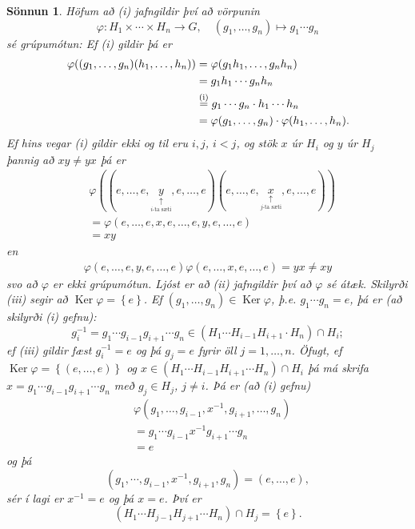 \documentclass[a4paper,icelandic,11pt]{book}
\theoremstyle{plain}
\newtheorem*{sonnun}{Sönnun}
\DeclareMathOperator{\Ker}{Ker} %
\begin{document}
\begin{sonnun}
  Höfum að (i) jafngildir því að vörpunin
  \[
    \varphi: H_1\times\cdots\times H_n\to G,
    \quad
    (g_1,\dots,g_n)\mapsto g_1\cdots g_n
  \]
  sé grúpumótun: Ef (i) gildir þá er 
  \begin{align*}
    \varphi((g_1,\dots,g_n)(h_1,\dots,h_n))
    &= \varphi(g_1h_1,\dots,g_nh_n)
    \\
    &= g_1h_1\cdots g_nh_n
    \\
    &\overset{\text{\scriptsize(i)}}{=} g_1\cdots g_n \cdot h_1\cdots h_n
    \\
    &= \varphi(g_1,\dots,g_n)\cdot \varphi(h_1,\dots,h_n).
  \end{align*}
  Ef hins vegar (i) gildir ekki og til eru $i,j$, $i< j$, og stök $x$ úr $H_i$ 
  og $y$ úr $H_j$ þannig að $xy \neq yx$ þá er
  \begin{align*}
    & \varphi((e,\dots,e,
    \underset{\underset{i\text{-ta sæti}}{\uparrow}}{y},
    e,\dots,e)
    (e,\dots,e,
    \underset{\underset{j\text{-ta sæti}}{\uparrow}}{x},
    e,\dots,e))
    \\
    &= \varphi(e,\dots,e,x,e,\dots,e,y,e,\dots,e)
    \\
    &= xy
  \end{align*}
  en 
  \begin{align*}
    \varphi(e,\dots,e,y,e,\dots,e)\varphi(e,\dots,x,e,\dots,e)
    = yx
    \neq xy
  \end{align*}
  svo að $\varphi$ er ekki grúpumótun. Ljóst er að (ii) jafngildir því að
  $\varphi$ sé átæk. Skilyrði (iii) segir að $\Ker\varphi = \left\{ e \right\}$.
  Ef $(g_1,\dots,g_n)\in \Ker\varphi$, þ.e. $g_1\cdots g_n = e$, þá er (að
  skilyrði (i) gefnu):
  \begin{equation*}
    g_i^{-1}
    = g_1\cdots g_{i-1}g_{i+1}\cdots g_n
    \in (H_1\cdots H_{i-1}H_{i+1}\cdot H_n)\cap H_i;
  \end{equation*}
  ef (iii) gildir fæst $g_i^{-1}=e$ og þá $g_j = e$ fyrir öll $j=1,\dots,n$.
  Öfugt, ef $\Ker\varphi = \left\{ (e,\dots,e) \right\}$ og 
  $x\in (H_1\cdots H_{i-1}H_{i+1}\cdots H_n)\cap H_i$ þá má skrifa
  $x = g_1\cdots g_{i-1}g_{i+1}\cdots g_n$ með $g_j\in H_j$, $j\neq i$. Þá er
  (að (i) gefnu)
  \begin{align*}
    & \varphi(g_1,\dots,g_{i-1},x^{-1},g_{i+1},\dots,g_n)
    \\
    &= g_1\cdots g_{i-1} x^{-1} g_{i+1} \cdots g_n
    \\
    &= e
  \end{align*}
  og þá
  \[
    (g_1,\cdots,g_{i-1},x^{-1},g_{i+1},g_n)
    = (e,\dots,e),
  \]
  sér í lagi er $x^{-1} = e$ og þá $x = e$. Því er
  \[
    (H_1\cdots H_{j-1} H_{j+1}\cdots H_n)\cap H_j
    = \left\{ e \right\}.
  \]
\end{sonnun}
\end{document}
